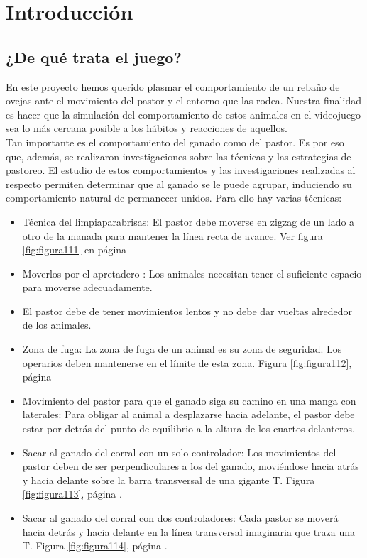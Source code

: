 \section{Introducción}
\label{sec:introduccion}

\subsection{¿De qué trata el juego?}
\label{subsubsection:intro_juego}

En este proyecto hemos querido plasmar el comportamiento de un rebaño de ovejas ante el movimiento del pastor y el entorno que las rodea. 
Nuestra finalidad es hacer que la simulación del comportamiento de estos animales en el videojuego sea lo más cercana posible a los hábitos 
y reacciones de aquellos. \\

Tan importante es el comportamiento del ganado como del pastor. Es por eso que, además, se realizaron investigaciones sobre las técnicas y 
las estrategias de pastoreo. El estudio de estos comportamientos y las investigaciones realizadas al respecto permiten determinar que al 
ganado se le puede agrupar, induciendo su comportamiento natural de permanecer unidos. Para ello hay varias técnicas:

\begin{itemize}
 \item Técnica del limpiaparabrisas: El pastor debe moverse en zigzag de un lado a otro de la manada para mantener la línea recta de avance. 
 Ver figura \ref{fig:figura111} en página \pageref{fig:figura111}

 \item Moverlos por el apretadero : Los animales necesitan tener el suficiente espacio para moverse adecuadamente.

 \item El pastor debe de tener movimientos lentos y no debe dar vueltas alrededor de los animales.

 \item Zona de fuga: La zona de fuga de un animal es su zona de seguridad. Los operarios deben mantenerse en el límite de esta zona. Figura \ref{fig:figura112}, 
 página \pageref{fig:figura112}

 \item Movimiento del pastor para que el ganado siga su camino en una manga con laterales: Para obligar al animal a desplazarse hacia adelante, 
 el pastor debe estar por detrás del punto de equilibrio a la altura de los cuartos delanteros.

 \item Sacar al ganado del corral con un solo controlador: Los movimientos del pastor deben de ser perpendiculares a los del ganado, moviéndose 
 hacia atrás y hacia delante sobre la barra transversal de una gigante T. Figura \ref{fig:figura113}, página \pageref{fig:figura113}.

 \item Sacar al ganado del corral con dos controladores:  Cada pastor se moverá hacia detrás y hacia delante en la línea transversal imaginaria 
 que traza una T. Figura \ref{fig:figura114}, página \pageref{fig:figura114}.
\end{itemize}

